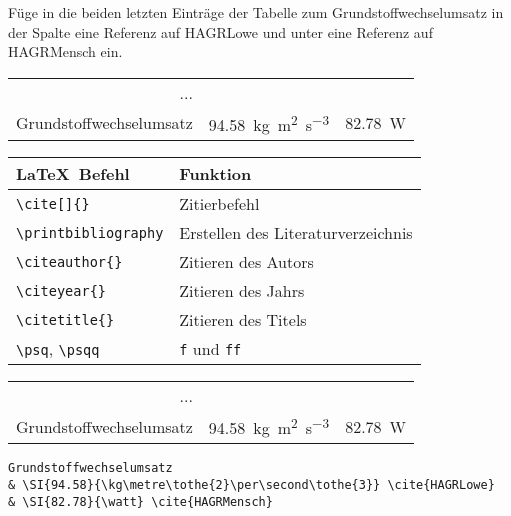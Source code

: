 \begin{frame}[fragile]
	\begin{Aufgabe}
		Füge in die beiden letzten Einträge der Tabelle zum Grundstoffwechselumsatz in der Spalte  eine Referenz auf \textrm{HAGRLowe} und unter  eine Referenz auf \textrm{HAGRMensch} ein.
	\end{Aufgabe}
	\begin{outputbox}
		\begin{tabular}{rcc}
			...&&\\
			Grundstoffwechselumsatz	&	\SI{94.58 }{\kg\metre\tothe{2}\per\second\tothe{3}}	\cite{HAGRLowe}		&	\SI{82.78}{\watt}	\cite{HAGRMensch}
		\end{tabular}
	\end{outputbox}
	\btVFill\Befehle
	\begin{center}
		\begin{tabular}{ll}
			\toprule
			\LaTeX\ Befehl							&	Funktion					\\ \midrule
			\lstinline|\cite[]{}|					&	Zitierbefehl\\
			\lstinline|\printbibliography|			&	Erstellen des Literaturverzeichnis\\
			\lstinline|\citeauthor{}|				&	Zitieren des Autors \\
			\lstinline|\citeyear{}|					&	Zitieren des Jahrs \\
			\lstinline|\citetitle{}|				&	Zitieren des Titels \\
			\lstinline|\psq|, \lstinline|\psqq|		&	\texttt{f} und \texttt{ff} \\
			\bottomrule
		\end{tabular}
	\end{center}
	\vspace{0.1cm}
\end{frame}
\begin{frame}[fragile]
	\Losung
	\begin{outputbox}
		\begin{tabular}{rcc}
			...&&\\
			Grundstoffwechselumsatz	&	\SI{94.58 }{\kg\metre\tothe{2}\per\second\tothe{3}}	\cite{HAGRLowe}		&	\SI{82.78}{\watt}	\cite{HAGRMensch}
		\end{tabular}
	\end{outputbox}
	\Code
	\begin{lstlisting}[tabsize=1]
Grundstoffwechselumsatz
& \SI{94.58}{\kg\metre\tothe{2}\per\second\tothe{3}} \cite{HAGRLowe}
& \SI{82.78}{\watt} \cite{HAGRMensch}
	\end{lstlisting}
\end{frame}
